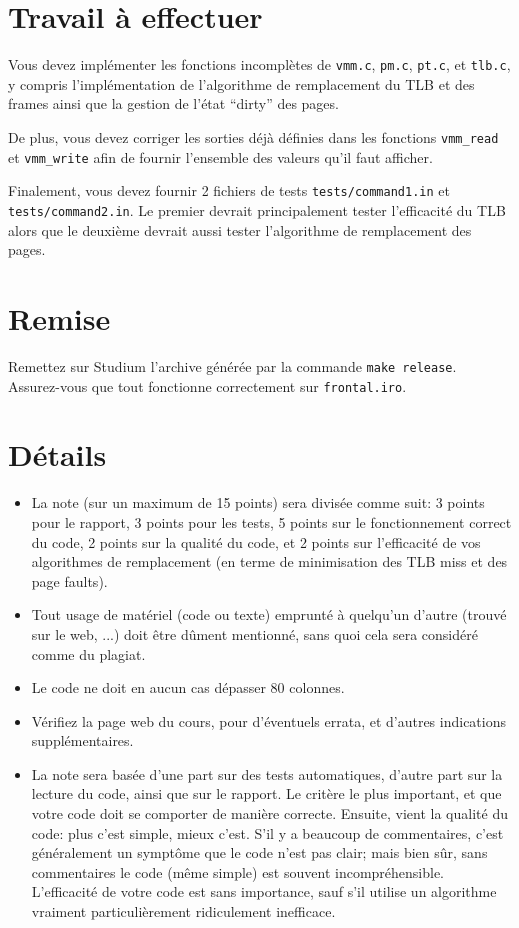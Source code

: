 \documentclass{article}
\begin{document}
\section{Travail à effectuer}

Vous devez implémenter les fonctions incomplètes de \texttt{vmm.c},
\texttt{pm.c}, \texttt{pt.c}, et \texttt{tlb.c}, y compris l'implémentation
de l'algorithme de remplacement du TLB et des frames ainsi que la gestion de
l'état ``dirty'' des pages.

De plus, vous devez corriger les sorties déjà définies dans les fonctions
\texttt{vmm\_read} et \texttt{vmm\_write} afin de fournir l'ensemble des
valeurs qu'il faut afficher.  

Finalement, vous devez fournir 2 fichiers de tests
\texttt{tests/command1.in} et \texttt{tests/command2.in}.  Le premier
devrait principalement tester l'efficacité du TLB alors que le deuxième
devrait aussi tester l'algorithme de remplacement des pages.

\section{Remise}

Remettez sur Studium l'archive générée par la commande \texttt{make release}.
Assurez-vous que tout fonctionne correctement sur \texttt{frontal.iro}.

\section{Détails}

\begin{itemize}
\item La note (sur un maximum de 15 points) sera divisée comme suit:
  3 points pour le rapport, 3 points pour les tests, 5 points sur le
  fonctionnement correct du code, 2 points sur la qualité du code, et
  2 points sur l'efficacité de vos algorithmes de remplacement (en terme de
  minimisation des TLB miss et des page faults).
\item Tout usage de matériel (code ou texte) emprunté à quelqu'un d'autre
  (trouvé sur le web, ...) doit être dûment mentionné, sans quoi cela sera
  considéré comme du plagiat.
\item Le code ne doit en aucun cas dépasser 80 colonnes.
\item Vérifiez la page web du cours, pour d'éventuels errata, et d'autres
  indications supplémentaires.
\item La note sera basée d'une part sur des tests automatiques, d'autre part
  sur la lecture du code, ainsi que sur le rapport.  Le critère le plus
  important, et que votre code doit se comporter de manière correcte.
  Ensuite, vient la qualité du code: plus c'est simple, mieux c'est.
  S'il y a beaucoup de commentaires, c'est généralement un symptôme que le
  code n'est pas clair; mais bien sûr, sans commentaires le code (même
  simple) est souvent incompréhensible.  L'efficacité de votre code est sans
  importance, sauf s'il utilise un algorithme vraiment particulièrement
  ridiculement inefficace.
\end{itemize}
\end{document}
